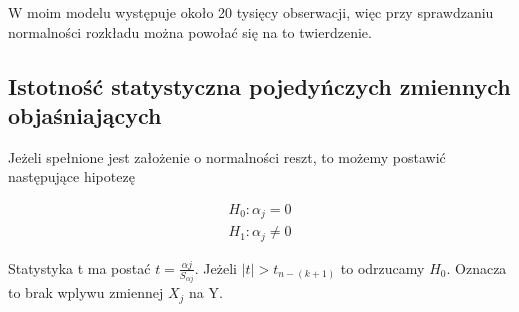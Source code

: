 W moim modelu występuje około 20 tysięcy obserwacji, więc przy sprawdzaniu normalności rozkładu można powołać się na to twierdzenie.

\subsection{Istotność statystyczna pojedyńczych zmiennych objaśniających}\label{subsec:istotność-statystyczna-zmiennych-objaśniających}
Jeżeli spełnione jest założenie o normalności reszt, to możemy postawić następujące hipotezę

\begin{equation}
    \begin{split}
        H_0: \alpha_j = 0 \\
        H_1: \alpha_j \ne 0
    \end{split}
\end{equation}

Statystyka t ma postać \(t = \frac{\alpha j}{S_{\alpha j}}\).
Jeżeli \(|t| > t_{n -(k+1)}\) to odrzucamy \(H_0\).
Oznacza to brak wplywu zmiennej \(X_j\) na Y.
